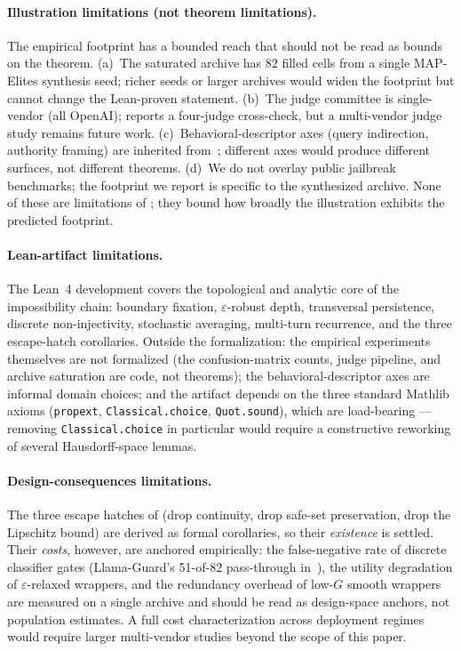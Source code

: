 \documentclass[11pt]{article}
\begin{document}
\paragraph{Illustration limitations (not theorem limitations).}
The empirical footprint has a bounded reach that should not be read
as bounds on the theorem. (a)~The saturated archive has $82$ filled
cells from a single MAP-Elites synthesis seed; richer seeds or larger
archives would widen the footprint but cannot change the Lean-proven
statement. (b)~The judge committee is single-vendor (all OpenAI);
 reports a four-judge cross-check, but a
multi-vendor judge study remains future work. (c)~Behavioral-descriptor
axes (query indirection, authority framing) are inherited
from~\cite{munshi2026manifold}; different axes would produce different
surfaces, not different theorems. (d)~We do not overlay public
jailbreak benchmarks; the footprint we report is specific to the
synthesized archive. None of these are limitations of
;
they bound how broadly the illustration exhibits the predicted
footprint.

\paragraph{Lean-artifact limitations.}
The Lean~4 development covers the topological and analytic core of
the impossibility chain: boundary fixation, $\varepsilon$-robust
depth, transversal persistence, discrete non-injectivity, stochastic
averaging, multi-turn recurrence, and the three escape-hatch
corollaries. Outside the formalization: the empirical experiments
themselves are not formalized (the confusion-matrix counts, judge
pipeline, and archive saturation are code, not theorems); the
behavioral-descriptor axes are informal domain choices; and the
artifact depends on the three standard Mathlib axioms
(\texttt{propext}, \texttt{Classical.choice}, \texttt{Quot.sound}),
which are load-bearing --- removing \texttt{Classical.choice} in
particular would require a constructive reworking of several
Hausdorff-space lemmas.

\paragraph{Design-consequences limitations.}
The three escape hatches of  (drop
continuity, drop safe-set preservation, drop the Lipschitz bound) are
derived as formal corollaries, so their \emph{existence} is settled.
Their \emph{costs}, however, are anchored empirically: the
false-negative rate of discrete classifier gates (Llama-Guard's
51-of-82 pass-through in~), the utility
degradation of $\varepsilon$-relaxed wrappers, and the redundancy
overhead of low-$G$ smooth wrappers are measured on a single archive
and should be read as design-space anchors, not population estimates.
A full cost characterization across deployment regimes would require
larger multi-vendor studies beyond the scope of this paper.
\end{document}
